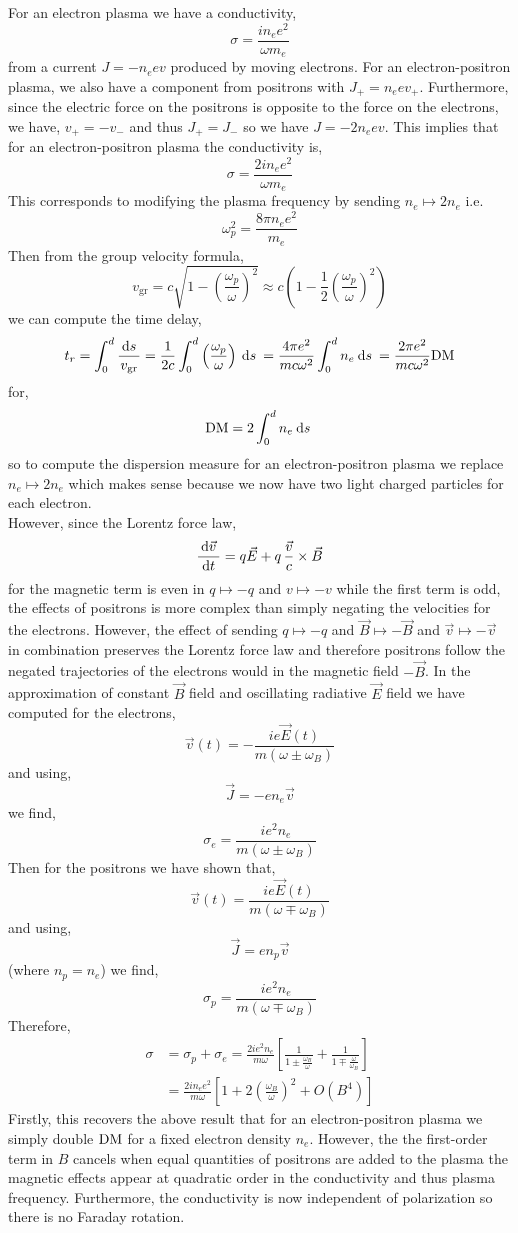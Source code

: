 \documentclass[12pt]{article}
\begin{document}
For an electron plasma we have a conductivity,
\[ \sigma = \frac{i n_e e^2}{\omega m_e} \]
from a current $J = - n_e e v$ produced by moving electrons. For an electron-positron plasma, we also have a component from positrons with $J_{+} = n_e e v_{+}$. Furthermore, since the electric force on the positrons is opposite to the force on the electrons, we have, $v_{+} = - v_{-}$ and thus $J_{+} = J_{-}$ so we have $J = - 2 n_e e v$. This implies that for an electron-positron plasma the conductivity is,
\[ \sigma = \frac{2 i n_e e^2}{\omega m_e} \]
This corresponds to modifying the plasma frequency by sending $n_e \mapsto 2 n_e$ i.e.
\[ \omega_p^2 = \frac{8 \pi n_e e^2}{m_e} \]
Then from the group velocity formula,
\[ v_{\mathrm{gr}} = c \sqrt{1 - \left( \frac{\omega_p}{\omega} \right)^2} \approx c \left( 1 - \frac{1}{2} \left( \frac{\omega_p}{\omega} \right)^2 \right) \]
we can compute the time delay,
\[ t_r = \int_0^d \frac{\: \mathrm{d}s \:}{v_{\text{gr}}} =  \frac{1}{2c} \int_0^d\left( \frac{\omega_p}{\omega} \right) \: \mathrm{d}s \: = \frac{4 \pi e^2}{m c \omega^2} \int_0^d n_e \: \mathrm{d}s \: = \frac{2 \pi e^2}{m c \omega^2} \mathrm{DM} \]
for,
\[ \mathrm{DM} = 2 \int_0^d n_e \: \mathrm{d}s \: \]
so to compute the dispersion measure for an electron-positron plasma we replace $n_e \mapsto 2 n_e$ which makes sense because we now have two light charged particles for each electron.
\bigskip\\
However, since the Lorentz force law,    
\[ \frac{\: \mathrm{d}\vec{v} \:}{\: \mathrm{d}t \:} = q \vec{E} + q \, \frac{\vec{v}}{c} \times \vec{B} \]
for the magnetic term is even in $q \mapsto - q$ and $v \mapsto - v$ while the first term is odd, the effects of positrons is more complex than simply negating the velocities for the electrons. However, the effect of sending $q \mapsto -q$ and $\vec{B} \mapsto - \vec{B}$ and $\vec{v} \mapsto - \vec{v}$ in combination preserves the Lorentz force law and therefore positrons follow the negated trajectories of the electrons would in the magnetic field $- \vec{B}$. In the approximation of constant $\vec{B}$ field and oscillating radiative $\vec{E}$ field we have computed for the electrons,
\[ \vec{v}(t) = - \frac{i e \vec{E}(t)}{m (\omega \pm \omega_B)} \]
and using,
\[ \vec{J} = - e n_e \vec{v} \]
we find,
\[ \sigma_{e} = \frac{i e^2 n_e}{m (\omega \pm \omega_B)} \]
Then for the positrons we have shown that,
\[ \vec{v}(t) =  \frac{i e \vec{E}(t)}{m (\omega \mp \omega_{B})} \]
and using,
\[ \vec{J} = e n_p \vec{v} \]
(where $n_p = n_e$)
we find,
\[ \sigma_{p} = \frac{i e^2 n_e}{m(\omega \mp \omega_B)} \]
Therefore,
\begin{align*}
\sigma & = \sigma_{p} + \sigma_{e} = \frac{2 i e^2 n_e}{m \omega} \left[ \frac{1}{1 \pm \frac{\omega_B}{\omega}} + \frac{1}{1 \mp \frac{\omega}{\omega_B}} \right]
\\
& = \frac{2 i n_e e^2}{m \omega} \left[1 + 2 \left( \frac{\omega_B}{\omega} \right)^2 + O(B^4) \right]
\end{align*}
Firstly, this recovers the above result that for an electron-positron plasma we simply double $\mathrm{DM}$ for a fixed electron density $n_e$. However, the the first-order term in $B$ cancels when equal quantities of positrons are added to the plasma the magnetic effects appear at quadratic order in the conductivity and thus plasma frequency. Furthermore, the conductivity is now independent of polarization so there is no Faraday rotation. 
\end{document}
